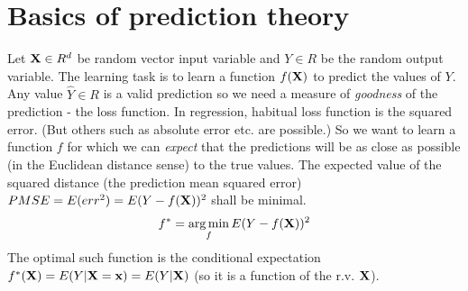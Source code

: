 
\clearpage

\section{Basics of prediction theory}\label{sec:BasicPredictionTheory}

Let $\mathbf{X} \in R^d$ be random vector input variable and $Y \in R$ be the random output variable.
The learning task is to learn a function $f(\mathbf{X})$ to predict the values of $Y$. Any value $\hat{Y} \in R$ is a valid prediction so we need a measure of \emph{goodness} of the prediction - the loss function.
In regression, habitual loss function is the squared error. (But others such as absolute error etc. are possible.) So we want to learn a function $f$ for which we can \emph{expect} that the predictions will be as close as possible (in the Euclidean distance sense) to the true values. The expected value of the squared distance (the prediction mean squared error)
$PMSE = E (err^2) = E (Y - f(\mathbf{X}))^2$  shall be minimal.
\begin{equation}
f^* = \operatorname*{arg\,min}_f E (Y - f(\mathbf{X}))^2
\end{equation}
The optimal such function is the conditional expectation $f^*(\mathbf{X}) = E(Y|\mathbf{X}=\mathbf{x}) = E(Y|\mathbf{X})$ (so it is a function of the r.v. $\mathbf{X}$).

